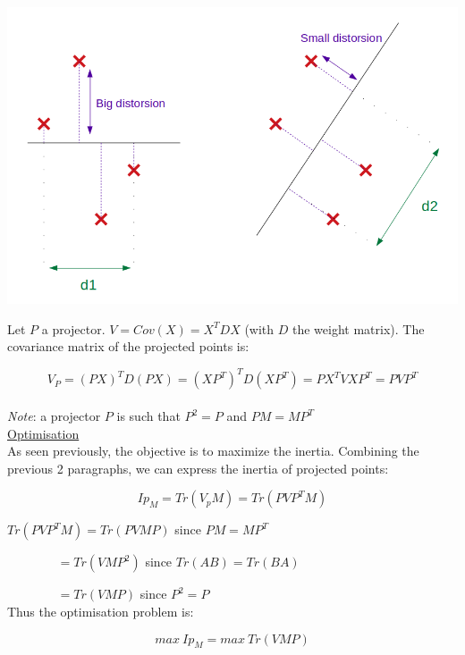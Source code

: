 \begin{center}
\includegraphics[scale=0.4]{PCA_projections.png}
\end{center}

Let $P$ a projector. $V = Cov(X) = X^TDX$ (with $D$ the weight matrix). The covariance matrix of the projected points is:

$$V_P = (PX)^TD(PX) = (XP^T)^TD(XP^T) = PX^TVXP^T = PVP^T$$ \\

\textit{Note}: a projector $P$ is such that $P^2=P$ and $PM = MP^T$ \\

\underline{Optimisation} \\

As seen previously, the objective is to maximize the inertia. Combining the previous 2 paragraphs, we can express the inertia of projected points:

$$Ip_M = Tr(V_pM) = Tr(PVP^TM)$$

$Tr(PVP^TM) = Tr(PVMP)$ since $PM = MP^T$

$~~~~~~~~~~~~~~~~~~= Tr(VMP^2)$ since $Tr(AB) = Tr(BA)$

$~~~~~~~~~~~~~~~~~~= Tr(VMP)$ since $P^2 = P$ \\

Thus the optimisation problem is:

$$max~Ip_M = max~Tr(VMP)$$

\vspace{5mm}